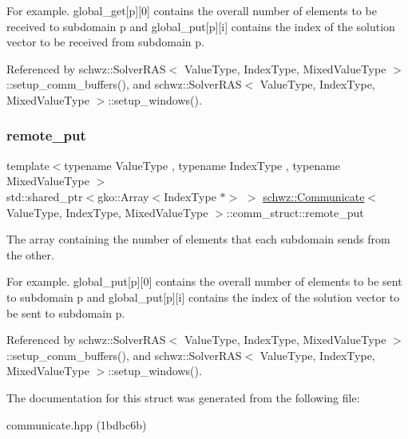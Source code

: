 For example. global\+\_\+get\mbox{[}p\mbox{]}\mbox{[}0\mbox{]} contains the overall number of elements to be received to subdomain p and global\+\_\+put\mbox{[}p\mbox{]}\mbox{[}i\mbox{]} contains the index of the solution vector to be received from subdomain p. 

Referenced by schwz\+::\+Solver\+R\+A\+S$<$ Value\+Type, Index\+Type, Mixed\+Value\+Type $>$\+::setup\+\_\+comm\+\_\+buffers(), and schwz\+::\+Solver\+R\+A\+S$<$ Value\+Type, Index\+Type, Mixed\+Value\+Type $>$\+::setup\+\_\+windows().

\mbox{\label{structschwz_1_1Communicate_1_1comm__struct_a206d13b093699bf04bd1efb51c4290f2}} 
\subsubsection{\texorpdfstring{remote\+\_\+put}{remote\_put}}
{\footnotesize\ttfamily template$<$typename Value\+Type , typename Index\+Type , typename Mixed\+Value\+Type $>$ \\
std\+::shared\+\_\+ptr$<$gko\+::\+Array$<$Index\+Type $\ast$$>$ $>$ \hyperlink{classschwz_1_1Communicate}{schwz\+::\+Communicate}$<$ Value\+Type, Index\+Type, Mixed\+Value\+Type $>$\+::comm\+\_\+struct\+::remote\+\_\+put}



The array containing the number of elements that each subdomain sends from the other. 

For example. global\+\_\+put\mbox{[}p\mbox{]}\mbox{[}0\mbox{]} contains the overall number of elements to be sent to subdomain p and global\+\_\+put\mbox{[}p\mbox{]}\mbox{[}i\mbox{]} contains the index of the solution vector to be sent to subdomain p. 

Referenced by schwz\+::\+Solver\+R\+A\+S$<$ Value\+Type, Index\+Type, Mixed\+Value\+Type $>$\+::setup\+\_\+comm\+\_\+buffers(), and schwz\+::\+Solver\+R\+A\+S$<$ Value\+Type, Index\+Type, Mixed\+Value\+Type $>$\+::setup\+\_\+windows().



The documentation for this struct was generated from the following file\+:\begin{DoxyCompactItemize}
\item 
communicate.\+hpp (1bdbc6b)\end{DoxyCompactItemize}
